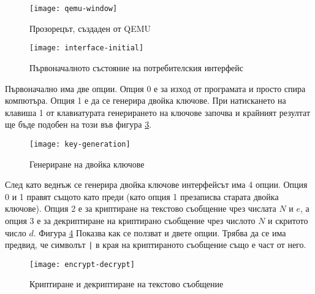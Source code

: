   \begin{figure}[htpb]
    \centering
    \texttt{[image: qemu-window]}
    \caption{Прозорецът, създаден от QEMU}
    \label{fig:qemu-window}
  \end{figure}

  \begin{figure}[htpb]
    \centering
    \texttt{[image: interface-initial]}
    \caption{Първоначалното състояние на потребителския интерфейс}
    \label{fig:interface-initial}
  \end{figure}

  Първоначално има две опции. Опция 0 е за изход от програмата и просто спира компютъра. Опция 1 е да се генерира двойка ключове. При натискането на клавиша 1 от клавиатурата генерирането на ключове започва и крайният резултат ще бъде подобен на този във фигура \ref{fig:interface-key-generation}.

  \begin{figure}[htpb]
    \centering
    \texttt{[image: key-generation]}
    \caption{Генериране на двойка ключове}
    \label{fig:interface-key-generation}
  \end{figure}

  След като веднъж се генерира двойка ключове интерфейсът има 4 опции. Опция 0 и 1 правят същото като преди (като опция 1 презаписва старата двойка ключове). Опция 2 е за криптиране на текстово съобщение чрез числата $N$ и $e$, а опция 3 е за декриптиране на криптирано съобщение чрез числото $N$ и скритото число $d$. Фигура \ref{fig:interface-encrypt-decrypt} Показва как се ползват и двете опции. Трябва да се има предвид, че символът {\tt |} в края на криптираното съобщение също е част от него.

  \begin{figure}[htpb]
    \centering
    \texttt{[image: encrypt-decrypt]}
    \caption{Криптиране и декриптиране на текстово съобщение}
    \label{fig:interface-encrypt-decrypt}
  \end{figure}

